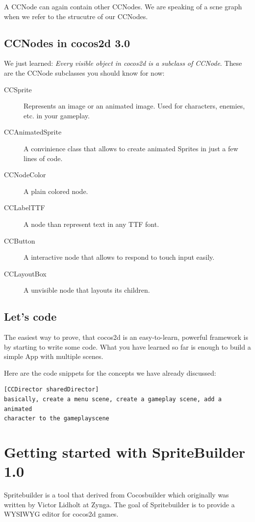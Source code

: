 \documentclass{scrreprt}
\newcommand{\cocos}{cocos2d}
\newcommand{\spriteb}{SpriteBuilder}
\begin{document}
A CCNode can again contain other CCNodes. We are speaking of a scne graph when
we refer to the strucutre of our CCNodes.

\section{CCNodes in \cocos{} 3.0}
We just learned: \textit{Every visible object in \cocos{} is a subclass of
CCNode}. These are the CCNode subclasses you should know for now:

\begin{description}
  \item[CCSprite] Represents an image or an animated image. Used for characters,
  enemies, etc. in your gameplay.
  \item[CCAnimatedSprite] A convinience class that allows to create animated
  Sprites in just a few lines of code.
  \item[CCNodeColor] A plain colored node.
  \item[CCLabelTTF] A node than represent text in any TTF font.
  \item[CCButton] A interactive node that allows to respond to touch input
  easily.
  \item[CCLayoutBox] A unvisible node that layouts its children.
\end{description}

\section{Let's code}
The easiest way to prove, that \cocos{} is an easy-to-learn, powerful framework
is by starting to write some code. What you have learned so far is enough to
build a simple App with multiple scenes.

Here are the code snippets for the concepts we have already discussed:

\begin{lstlisting}
[CCDirector sharedDirector]
basically, create a menu scene, create a gameplay scene, add a animated
character to the gameplayscene
\end{lstlisting} 


\chapter{Getting started with \spriteb{} 1.0}
Spritebuilder is a tool that derived from Cocosbuilder which originally was
written by Victor Lidholt at Zynga. The goal of Spritebuilder is to provide a
WYSIWYG editor for \cocos{} games. 
\end{document}
